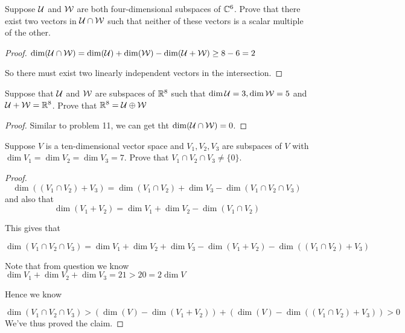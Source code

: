 \documentclass{extarticle}
\begin{document}
\begin{problem}{11}
    Suppose \(\mathcal{U}\) and \(\mathcal{W}\) are both four-dimensional subspaces of \(\mathbb{C}^6\). Prove that 
    there exist two vectors in \(\mathcal{U} \cap \mathcal{W}\) such that neither of these vectors is a 
    scalar multiple of the other. 
\end{problem}

\begin{proof}
\(\dim (\mathcal{U} \cap \mathcal{W}) = \dim(\mathcal{U}) + \dim (\mathcal{W}) - \dim(\mathcal{U} + \mathcal{W}) \geq 8-6= 2\)

So there must exist two linearly independent vectors in the intersection. 
\end{proof}

\begin{problem}{12}
    Suppose that \(\mathcal{U}\) and \(\mathcal{W}\) are subspaces of \(\mathbb{R}^8\) such that 
    \(\dim \mathcal{U} = 3, \dim \mathcal{W} = 5\) and \(\mathcal{U} + \mathcal{W} = \mathbb{R}^8\). Prove that 
    \(\mathbb{R}^8 = \mathcal{U} \oplus \mathcal{W}\)
\end{problem}

\begin{proof}
Similar to problem 11, we can get tht \(\dim (\mathcal{U} \cap \mathcal{W}) = 0\). 
\end{proof}


\begin{problem}{14}
    Suppose \(V\) is a ten-dimensional vector space and \(V_1, V_2, V_3\) are subspaces 
    of \(V\) with \(\dim V_1 = \dim V_2 = \dim V_3 = 7\). Prove that \(V_1 \cap V_2 
    \cap V_3 \neq \{0\}\). 
\end{problem}

\begin{proof}
\[\dim ((V_1 \cap V_2) + V_3) = \dim (V_1 \cap V_2) + \dim V_3 - \dim (V_1 \cap V_2 \cap V_3) \]
and also that 
\[\dim (V_1 + V_2) = \dim V_1 + \dim V_2 - \dim(V_1 \cap V_2)\]

This gives that 

\[\dim (V_1 \cap V_2 \cap V_3) = \dim V_1 + \dim V_2 + \dim V_3 - \dim (V_1 + V_2) - 
\dim ((V_1 \cap V_2) + V_3)\]

Note that from question we know \(\dim V_1 + \dim V_2 + \dim V_3 = 21 > 20 = 2\dim V\)

Hence we know 

\[\dim (V_1 \cap V_2 \cap V_3) > (\dim(V) - \dim(V_1 + V_2)) + (\dim(V) - \dim(
    (V_1 \cap V_2) + V_3
)) > 0\]
We've thus proved the claim.

\end{proof}
\end{document}
